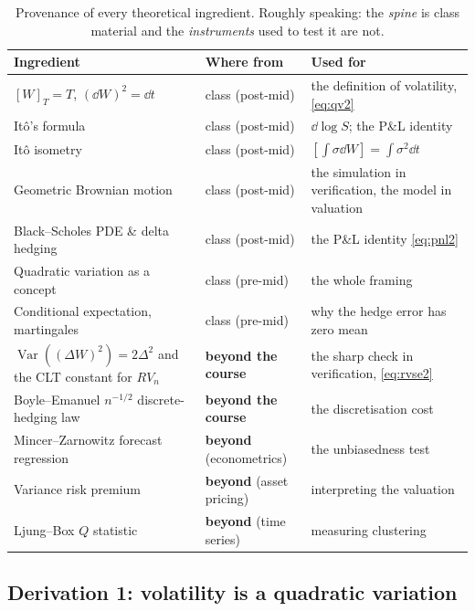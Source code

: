\documentclass[11pt,a4paper]{article}
\begin{document}
\begin{table}[H]
\centering\small
\begin{tabular}{L{6.4cm}L{3.1cm}L{5.3cm}}
\toprule
\textbf{Ingredient} & \textbf{Where from} & \textbf{Used for} \\
\midrule
$[W]_T=T$, $(\dd W)^2=\dd t$ & class (post-mid) & the definition of volatility, \eqref{eq:qv2} \\
It\^o's formula & class (post-mid) & $\dd\log S$; the P\&L identity \\
It\^o isometry & class (post-mid) & $[\int\sigma\dd W]=\int\sigma^2\dd t$ \\
Geometric Brownian motion & class (post-mid) & the simulation in verification, the model in valuation \\
Black--Scholes PDE \& delta hedging & class (post-mid) & the P\&L identity \eqref{eq:pnl2} \\
Quadratic variation as a concept & class (pre-mid) & the whole framing \\
Conditional expectation, martingales & class (pre-mid) & why the hedge error has zero mean \\
\midrule
$\operatorname{Var}((\Delta W)^2)=2\Delta^2$ and the CLT constant for $RV_n$
  & \textbf{beyond the course} & the sharp check in verification, \eqref{eq:rvse2} \\
Boyle--Emanuel $n^{-1/2}$ discrete-hedging law & \textbf{beyond the course} & the
  discretisation cost \\
Mincer--Zarnowitz forecast regression & \textbf{beyond} (econometrics) & the unbiasedness test \\
Variance risk premium & \textbf{beyond} (asset pricing) & interpreting the valuation \\
Ljung--Box $Q$ statistic & \textbf{beyond} (time series) & measuring clustering \\
\bottomrule
\end{tabular}
\caption{Provenance of every theoretical ingredient. Roughly speaking: the \emph{spine} is
class material and the \emph{instruments} used to test it are not.}
\end{table}

\subsection{Derivation 1: volatility is a quadratic variation}
\end{document}
